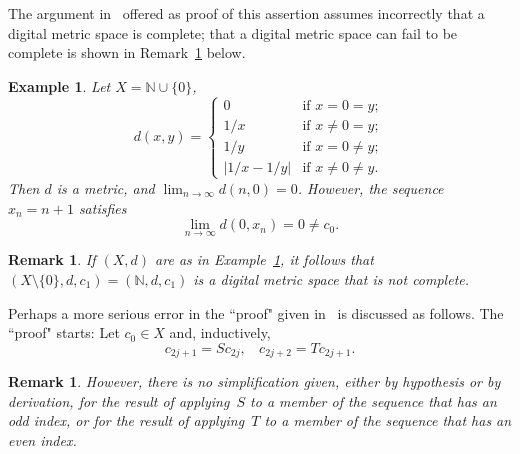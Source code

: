 \documentclass{article}
\newtheorem{remarks}[thm]{Remark}
\newtheorem{exl}[thm]{Example}
\numberwithin{thm}{section}
\def\N{{\mathbb N}}
\begin{document}
The argument in~\cite{OzEtal} offered as proof
of this assertion assumes incorrectly that a
digital metric space is complete; that
a digital metric space can fail to be
complete is shown in
Remark~\ref{nonStdRem} below.

\begin{exl}
{\rm \cite{Bx20}}
\label{nonStdMetric}
Let $X = \N \cup \{0\}$, 
\[ d(x,y) = \left \{ \begin{array}{ll}
            0 & \mbox{if } x=0=y; \\
            1/x & \mbox{if } x \neq 0 = y; \\
            1/y & \mbox{if } x = 0 \neq y; \\
            |1/x - 1/y| & \mbox{if } x \neq 0 \neq y.
            \end{array} \right .
\]
Then $d$ is a metric, and $\lim_{n \to \infty} d(n,0) = 0$. However,
the sequence $x_n=n+1$ satisfies 
\[ \lim_{n \to \infty} d(0, x_n) = 0 \neq c_0.
\]
\end{exl}

\begin{remarks}
\label{nonStdRem}
    If $(X,d)$ are as in Example~\ref{nonStdMetric},
    it follows that $(X \setminus \{0\},d,c_1)
    = (\N,d,c_1)$
    is a digital metric space that is 
    not complete.
\end{remarks}

Perhaps a more serious error in the ``proof"
given in~\cite{OzEtal} is discussed as
follows. The ``proof" starts:
Let $c_0 \in X$ and, inductively,
    \begin{equation}
    \label{S-onEven,T-onOdd}
        c_{2j+1} = Sc_{2j},~~~~ c_{2j+2} = Tc_{2j+1}.
    \end{equation}
\begin{remarks}
\label{unsimplifiable}
    However, there is no simplification given,
either by hypothesis or by derivation,
for the result of applying~$S$ to a member of
the sequence that has an odd index, or
for the result of applying~$T$ to a member of
the sequence that has an even index.
\end{remarks}
\end{document}
